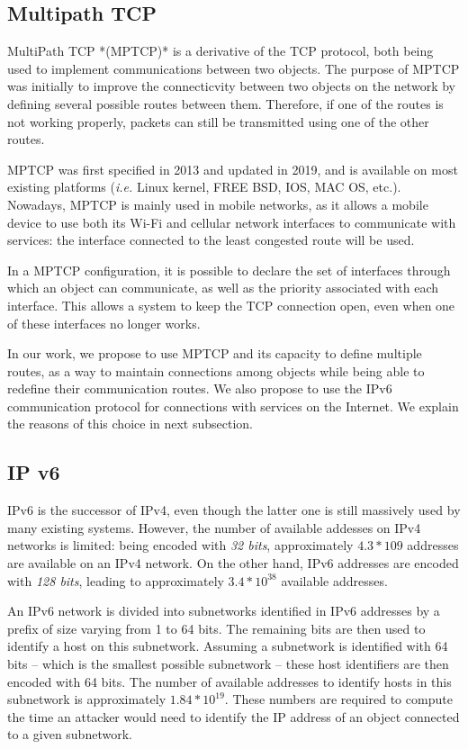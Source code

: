 \subsection {Multipath TCP}

\label{sec:mptcp}

{\Huge M}ultiPath TCP *(MPTCP)* is a derivative of the TCP protocol, both
being used to implement communications between two objects. The
purpose of MPTCP was initially to improve the connecticvity between
two objects on the network by defining several possible routes between
them. Therefore, if one of the routes is not working properly, packets
can still be transmitted using one of the other routes.

MPTCP was first specified in 2013 and updated in 2019, and is
available on most existing platforms (\emph{i.e.} Linux kernel, FREE
BSD, IOS, MAC OS, etc.). Nowadays, MPTCP is mainly used in mobile
networks, as it allows a mobile device to use both its Wi-Fi and
cellular network interfaces to communicate with services: the
interface connected to the least congested route will be used.

In a MPTCP configuration, it is possible to declare the set of
interfaces through which an object can communicate, as well as the
priority associated with each interface.  This allows a system to keep
the TCP connection open, even when one of these interfaces no longer
works.

In our work, we propose to use MPTCP and its capacity to define
multiple routes, as a way to maintain connections among objects while
being able to redefine their communication routes. We also propose to
use the IPv6 communication protocol for connections with services on
the Internet. We explain the reasons of this choice in next
subsection.


\subsection {IP v6}

\label{sec:ipv6}

IPv6 is the successor of IPv4, even though the latter one is still
massively used by many existing systems. However, the number of
available addesses on IPv4 networks is limited: being encoded with
\emph{32 bits}, approximately $4.3*10{9}$ addresses are available on an 
IPv4 network. On the other hand, IPv6 addresses are encoded with
\emph{128 bits}, leading to approximately $3.4*10^{38}$ available
addresses.

An IPv6 network is divided into subnetworks identified in IPv6 addresses by a
prefix of size varying from 1 to 64 bits. The remaining bits are then used to
identify a host on this subnetwork. Assuming a subnetwork is identified with 64
bits -- which is the smallest possible subnetwork -- these host identifiers
are then encoded with 64 bits. The number of available addresses to identify
hosts in this subnetwork is approximately $1.84*10^{19}$.
These numbers are required to compute the time an attacker would need
to identify the IP address of an object connected to a given
subnetwork. 

